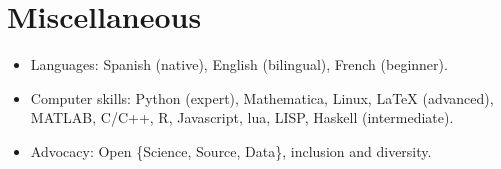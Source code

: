 \documentclass[12pt,]{scrartcl}
\begin{document}
\section{Miscellaneous}\label{misc}

\begin{itemize}
\leftskip-0.25in

\item Languages: Spanish (native), English (bilingual), French (beginner).

\item Computer skills: Python (expert), Mathematica, Linux, LaTeX (advanced), MATLAB, C/C++, R, Javascript, lua, LISP, Haskell (intermediate).

\item Advocacy: Open \{Science, Source, Data\}, inclusion and diversity.

\end{itemize}
\end{document}
